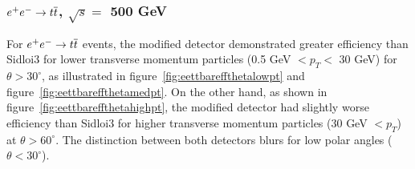 \subsubsection{$\ee \rightarrow \ttbar$, $ \sqrt{s} = $ 500 GeV}
For $\ee \rightarrow \ttbar$ events, the modified detector demonstrated greater efficiency than Sidloi3 for lower transverse
momentum particles (0.5 GeV $< p_{T} < $ 30 GeV) for $\theta > 30^{\circ}$,
as illustrated in figure~\ref{fig:eettbareffthetalowpt} and figure~\ref{fig:eettbareffthetamedpt}.
On the other hand, as shown in figure~\ref{fig:eettbareffthetahighpt}, the modified detector  
had slightly worse efficiency than Sidloi3 for
higher transverse momentum particles (30 GeV $< p_{T} $) at $\theta > 60^{\circ}$.
The distinction between both detectors blurs for low polar angles ($\theta < 30^{\circ}$).
